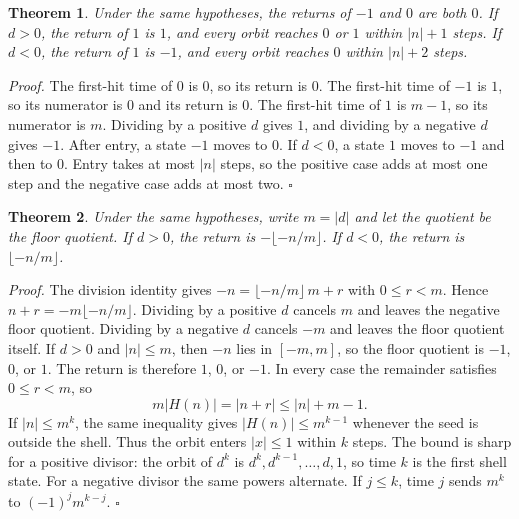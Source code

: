 \documentclass[11pt,letterpaper]{article}
\newtheorem{theorem}{Theorem}
\newenvironment{proof}{\noindent\textit{Proof.}}{\hfill\(\square\)}
\begin{document}
\begin{theorem}
\label{thm:oneoffsetend}
Under the same hypotheses, the returns of \(-1\) and \(0\) are both \(0\). If \(d>0\), the return of \(1\) is \(1\), and every orbit reaches \(0\) or \(1\) within \(\lvert n\rvert+1\) steps. If \(d<0\), the return of \(1\) is \(-1\), and every orbit reaches \(0\) within \(\lvert n\rvert+2\) steps.
\end{theorem}

\begin{proof}
The first-hit time of \(0\) is \(0\), so its return is \(0\). The first-hit time of \(-1\) is \(1\), so its numerator is \(0\) and its return is \(0\). The first-hit time of \(1\) is \(m-1\), so its numerator is \(m\). Dividing by a positive \(d\) gives \(1\), and dividing by a negative \(d\) gives \(-1\). After entry, a state \(-1\) moves to \(0\). If \(d<0\), a state \(1\) moves to \(-1\) and then to \(0\). Entry takes at most \(\lvert n\rvert\) steps, so the positive case adds at most one step and the negative case adds at most two.
\end{proof}

\begin{theorem}
\label{thm:oneoffsetclosed}
Under the same hypotheses, write \(m=\lvert d\rvert\) and let the quotient be the floor quotient. If \(d>0\), the return is \(-\lfloor -n/m\rfloor\). If \(d<0\), the return is \(\lfloor -n/m\rfloor\).
\end{theorem}

\begin{proof}
The division identity gives \(-n=\lfloor -n/m\rfloor\, m+r\) with \(0\le r<m\). Hence \(n+r=-m\lfloor -n/m\rfloor\). Dividing by a positive \(d\) cancels \(m\) and leaves the negative floor quotient. Dividing by a negative \(d\) cancels \(-m\) and leaves the floor quotient itself. If \(d>0\) and \(\lvert n\rvert\le m\), then \(-n\) lies in \([-m,m]\), so the floor quotient is \(-1\), \(0\), or \(1\). The return is therefore \(1\), \(0\), or \(-1\). In every case the remainder satisfies \(0\le r<m\), so
\[
m\lvert H(n)\rvert=\lvert n+r\rvert\le \lvert n\rvert+m-1.
\]
If \(\lvert n\rvert\le m^{k}\), the same inequality gives \(\lvert H(n)\rvert\le m^{k-1}\) whenever the seed is outside the shell. Thus the orbit enters \(\lvert x\rvert\le 1\) within \(k\) steps. The bound is sharp for a positive divisor: the orbit of \(d^{k}\) is \(d^{k},d^{k-1},\ldots,d,1\), so time \(k\) is the first shell state. For a negative divisor the same powers alternate. If \(j\le k\), time \(j\) sends \(m^{k}\) to \((-1)^{j}m^{k-j}\).
\end{proof}
\end{document}
